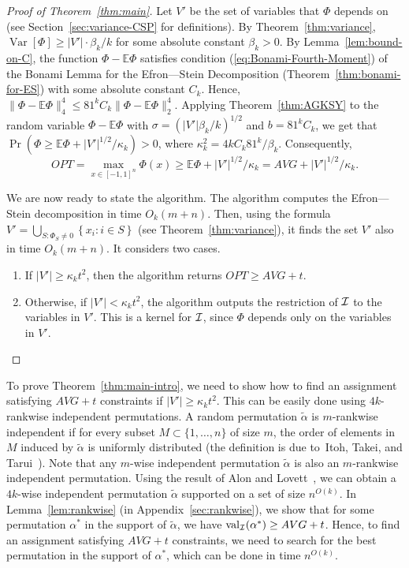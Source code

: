 \documentclass[11pt]{article}
\DeclareMathOperator {\val}  {val}
\DeclareMathOperator {\Var}  {Var}
\newcommand {\set}   [1] {\left\{ #1 \right\}}
\newcommand {\brc}   [1] {\left(#1\right)}
\newcommand {\Exp}       {\mathbb{E}}
\newcommand {\Prob}  [1] {\Pr \brc{#1 }}
\newcommand {\Varr}  [1] {\Var \left[#1\right]}
\newcommand {\calI}    {{\cal I}}
\begin{document}
\begin{proof}[Proof of Theorem~\ref{thm:main}]
Let $V'$ be the set of variables that $\Phi$ depends on (see Section~\ref{sec:variance-CSP} for definitions).
By Theorem~\ref{thm:variance}, $\Varr{\Phi} \geq |V'| \cdot \beta_k / k$ for some absolute constant $\beta_k > 0$.
By Lemma~\ref{lem:bound-on-C}, the function $\Phi - \Exp \Phi$ satisfies condition (\ref{eq:Bonami-Fourth-Moment})
of the Bonami Lemma for the Efron---Stein Decomposition (Theorem~\ref{thm:bonami-for-ES}) with some absolute constant $C_k$. Hence,
$\|\Phi - \Exp \Phi\|_4^4 \leq 81^k C_k  \|\Phi - \Exp \Phi\|_2^4$. Applying Theorem~\ref{thm:AGKSY}
to the random variable $\Phi - \Exp \Phi$ with $\sigma = (|V'| \beta_k / k)^{1/2}$ and $b = 81^k C_k$,
we get that $\Prob{\Phi \geq \Exp \Phi + |V'|^{1/2}/\kappa_k} > 0$, where $\kappa_k^2 = 4 kC_k 81^k/\beta_k$. Consequently,
$$OPT = \max_{x\in [-1,1]^n} \Phi (x) \geq \Exp \Phi + |V'|^{1/2}/\kappa_k = AVG + |V'|^{1/2}/\kappa_k.$$

We are now ready to state the algorithm. The algorithm computes the Efron---Stein decomposition in time $O_k(m+n)$.
Then, using the formula $V' = \bigcup_{S: \Phi_S \neq 0} \set{x_i:i\in S}$ (see Theorem~\ref{thm:variance}), it
finds the set $V'$ also in time $O_k(m+n)$. It considers two cases.
\begin{enumerate}
\item If $|V'| \geq \kappa_k t^2$, then the algorithm returns $OPT \geq AVG + t$.
\item Otherwise, if $|V'| < \kappa_k t^2$, the algorithm outputs
the restriction of $\calI$ to the variables in $V'$. This is a kernel for $\calI$, since $\Phi$ depends only on the variables in $V'$.
\end{enumerate}
\vspace{-2mm}
\end{proof}
\vspace{-2mm}
To prove Theorem~\ref{thm:main-intro}, we need to show how to find an assignment satisfying $AVG + t$ constraints if $|V'| \geq \kappa_k t^2$.
This can be easily done using $4k$-rankwise independent permutations. A random permutation $\tilde{\alpha}$ is $m$-rankwise independent if
for every subset $M\subset \{1,\dots, n\}$ of size $m$, the order of elements in $M$ induced by $\tilde{\alpha}$ is uniformly distributed (the definition
is due to~Itoh, Takei, and Tarui~\cite{ITT}). Note that any $m$-wise independent permutation $\tilde{\alpha}$ is also an
$m$-rankwise independent permutation. Using the result of Alon and Lovett~\cite{AL}, we can obtain
a $4k$-wise independent permutation $\tilde{\alpha}$ supported on a set of size $n^{O(k)}$. In Lemma~\ref{lem:rankwise} (in Appendix~\ref{sec:rankwise}),
we show that for some permutation $\alpha^*$ in the support of $\tilde{\alpha}$, we have $\val_{\calI}(\alpha^*)\geq AVG +t$.
Hence, to find an assignment satisfying $AVG+t$ constraints, we need to search for the best permutation in the support of $\alpha^*$,
which can be done in time $n^{O(k)}$.
\end{document}
